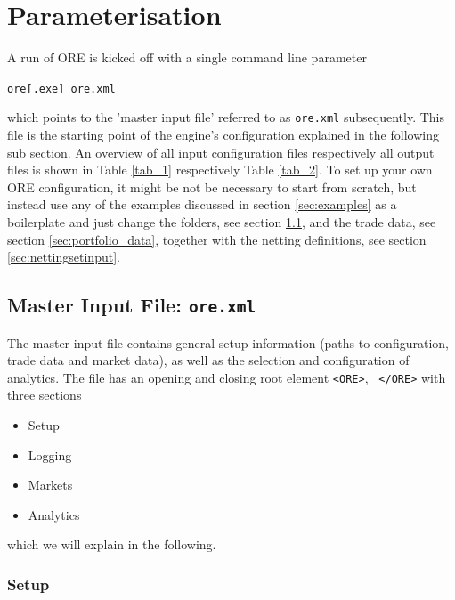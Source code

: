 \documentclass[12pt, a4paper]{article}
\begin{document}
\section{Parameterisation}\label{sec:configuration}

A run of ORE is kicked off with a single command line parameter 

\medskip
\centerline{\tt ore[.exe] ore.xml}
\medskip

which points to the 'master input file' referred to  as {\tt ore.xml} subsequently. 
This file is the starting point of the engine's configuration explained in the following sub section.
An overview of all input configuration files respectively all output files is shown in Table \ref{tab_1} respectively Table \ref{tab_2}.
To set up your own ORE configuration, it might be not be necessary to start from scratch, but instead use any of the examples discussed in section \ref{sec:examples} as a boilerplate and just change the folders, see section \ref{sec:master_input}, and the trade data, see section \ref{sec:portfolio_data}, together with the netting definitions, see section \ref{sec:nettingsetinput}.

\subsection{Master Input File: {\tt ore.xml}}\label{sec:master_input}

The master input file contains general setup information (paths to configuration, trade data and market data), as well
as the selection and configuration of analytics. The file has an opening and closing root element {\tt <ORE>}, {\tt
  </ORE>} with three sections
\begin{itemize}
\item Setup
\item Logging
\item Markets
\item Analytics
\end{itemize}
which we will explain in the following.

\subsubsection{Setup}
\end{document}
